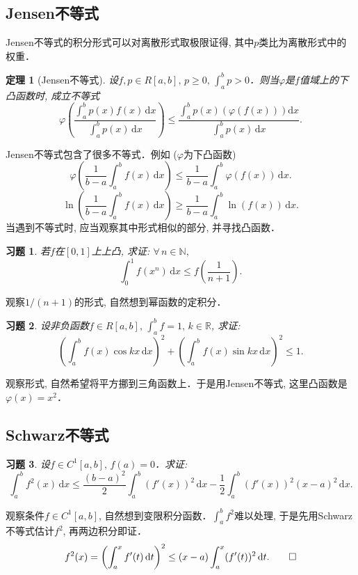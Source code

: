 \documentclass[11pt,a4paper]{ctexart}
\makeatletter
\theoremstyle{thmseries} %
\newtheorem{thm}{定理}[section]
\theoremstyle{exerseries}
\newtheorem{exer}{习题}[section]
\renewenvironment{proof}[1][\proofname]{\par
  \pushQED{\qed}%
  \normalfont \topsep6\p@\@plus6\p@\relax
  \trivlist
  \item[\hskip\labelsep
        \itshape
    #1\@addpunct{}]\ignorespaces
}{%
  \popQED\endtrivlist\@endpefalse
}
\newenvironment{pf}{\begin{proof}[\bfseries\upshape 证\quad]}{\end{proof}}
\newcommand{\bra}[1]{\mathopen{}\left(#1\right)}
\renewcommand{\phi}{\varphi}
\newcommand{\R}{\mathbb{R}}
\newcommand{\N}{\mathbb{N}}
\renewcommand{\d}{\mathrm{d}}
\makeatother
\begin{document}
\subsection{Jensen不等式}
Jensen不等式的积分形式可以对离散形式取极限证得, 其中$p$类比为离散形式中的权重．
\begin{thm}[Jensen不等式]
	设$f,p\in R[a,b],\,p\geq0,\,\int_{a}^{b}p>0$．则当$\phi$是$f$值域上的下凸函数时, 成立不等式
	\[\phi\bra{\frac{\int_{a}^{b}p(x)f(x)\,\d x}{\int_{a}^{b}p(x)\,\d x}}\leq\frac{\int_{a}^{b}p(x)\bra{\phi(f(x))}\d x}{\int_{a}^{b}p(x)\,\d x}.\]
\end{thm}

Jensen不等式包含了很多不等式．例如 ($\phi$为下凸函数)
\[\phi\bra{\frac{1}{b-a}\int_{a}^{b}f(x)\,\d x}\leq\frac{1}{b-a}\int_{a}^{b}\phi(f(x))\,\d x.\]
\[\ln\bra{\frac{1}{b-a}\int_{a}^{b}f(x)\,\d x}\geq\frac{1}{b-a}\int_{a}^{b}\ln(f(x))\,\d x.\]
当遇到不等式时, 应当观察其中形式相似的部分, 并寻找凸函数．

\begin{exer}
	若$f$在$[0,1]$上上凸, 求证: $\forall\,n\in\N,$
	\[\int_{0}^{1}f(x^n)\,\d x\leq f\bra{\frac{1}{n+1}}.\]
\end{exer}
\begin{pf}
	观察$1/(n+1)$的形式, 自然想到幂函数的定积分．
\end{pf}

\begin{exer}
	设非负函数$f\in R[a,b],\,\int_{a}^{b}f=1,\,k\in\R$, 求证: 
	\[\bra{\int_{a}^{b}f(x)\cos kx\,\d x}^2+\bra{\int_{a}^{b}f(x)\sin kx\,\d x}^2\leq1.\]
\end{exer}
\begin{pf}
	观察形式, 自然希望将平方挪到三角函数上．于是用Jensen不等式, 这里凸函数是$\phi(x)=x^2$．
\end{pf}

\subsection{Schwarz不等式}
\begin{exer}
	设$f\in C^1[a,b],\,f(a)=0$．求证: 
	\[\int_{a}^{b}f^2(x)\,\d x\leq\frac{(b-a)^2}{2}\int_{a}^{b}(f'(x))^2\,\d x-\frac{1}{2}\int_{a}^{b}(f'(x))^2(x-a)^2\,\d x.\]
\end{exer}
\begin{pf}
	观察条件$f\in C^1[a,b]$, 自然想到变限积分函数．$\int_{a}^{b} f^2$难以处理, 于是先用Schwarz不等式估计$f^2$, 再两边积分即证．
	\[f^2(x)=\bra{\int_{a}^{x}f'(t)\,\d t}^2\leq(x-a)\int_{a}^{x}(f'(t))^2\,\d t.\qedhere\]
\end{pf}
\end{document}
